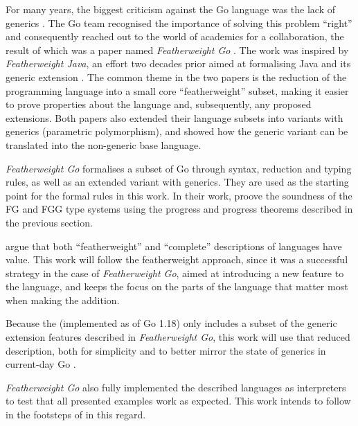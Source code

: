 For many years, the biggest criticism against the Go language was the lack of
generics \autocites{survey2021}{survey2020}{survey2019}. The Go team recognised
the importance of solving this problem ``right'' and consequently reached out to
the world of academics for a collaboration, the result of which was a paper
named \emph{Featherweight Go} \autocite{fg}. The work was inspired by
\emph{Featherweight Java}, an effort two decades prior aimed at formalising Java
and its generic extension \autocite{fj}. The common theme in the two papers is
the reduction of the programming language into a small core ``featherweight''
subset, making it easier to prove properties about the language and,
subsequently, any proposed extensions.
Both papers also extended their language subsets into variants with generics
(parametric polymorphism), and showed how the generic variant can be translated
into the non-generic base language.

\emph{Featherweight Go} formalises a subset of Go through syntax, reduction and
typing rules, as well as an extended variant with generics. They are used as the
starting point for the formal rules in this work. In their work, \citeauthor{fg}
proove the soundness of the FG and FGG type systems using the progress and
progress theorems described in the previous section.

\citeauthor{fg} argue that both ``featherweight'' and ``complete'' descriptions
of languages have value. This work will follow the featherweight approach, since
it was a successful strategy in the case of \emph{Featherweight Go}, aimed at
introducing a new feature to the language, and keeps the focus on the parts of
the language that matter most when making the addition.

Because the  (implemented as of Go 1.18) only
includes a subset of the generic extension features described in
\emph{Featherweight Go}, this work will use that reduced description, both for
simplicity and to better mirror the state of generics in current-day Go
\autocite{genericsProposal}.

\emph{Featherweight Go} also fully implemented the described languages as
interpreters to test that all presented examples work as expected. This work
intends to follow in the footsteps of \citeauthor{fg} in this regard.

